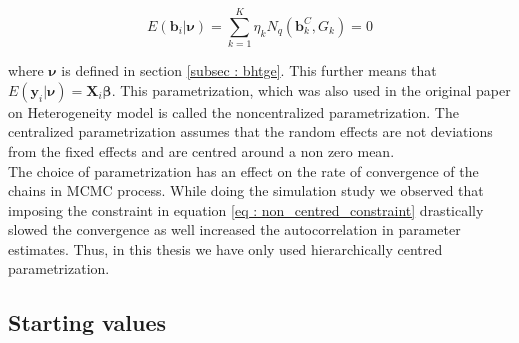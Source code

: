 \begin{equation}
\label{eq : non_centred_constraint}
E(\boldsymbol{b}_i | \boldsymbol{\nu}) = \sum_{k=1}^{K} \eta_k N_q(\boldsymbol{b}_k^C, G_k) = 0
\end{equation}

where $\boldsymbol{\nu}$ is defined in section \ref{subsec : bhtge}. This further means that $E(\boldsymbol{y}_i | \boldsymbol{\nu}) = \boldsymbol{X}_{i}\boldsymbol{\beta}$. This parametrization, which was also used in the original paper on Heterogeneity model \citep{verbeke_linear_1996} is called the noncentralized parametrization. The centralized parametrization assumes that the random effects are not deviations from the fixed effects and are centred around a non zero mean.\\

The choice of parametrization has an effect on the rate of convergence of the chains in MCMC process. While doing the simulation study we observed that imposing the constraint in equation \ref{eq : non_centred_constraint} drastically slowed the convergence as well increased the autocorrelation in parameter estimates. Thus, in this thesis we have only used hierarchically centred parametrization.

\subsection{Starting values}

